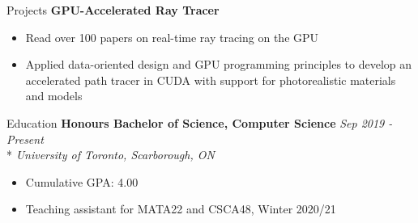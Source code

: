 \documentclass[11pt, letterpaper]{article}
\begin{document}
\begin{section}{Projects}
\textbf{GPU-Accelerated Ray Tracer}
\begin{itemize}
  \item Read over 100 papers on real-time ray tracing on the GPU
  \item Applied data-oriented design and GPU programming principles to develop an accelerated path tracer in CUDA with support for photorealistic materials and models \\
\end{itemize}

\end{section}

\begin{section}{Education}
\textbf{Honours Bachelor of Science, Computer Science}
\hfill
\textit{Sep 2019 - Present}\\*
\textit{University of Toronto, Scarborough, ON}
\begin{itemize}
  \item Cumulative GPA: 4.00
  \item Teaching assistant for MATA22 and CSCA48, Winter 2020/21
\end{itemize}

\end{section}
\end{document}
